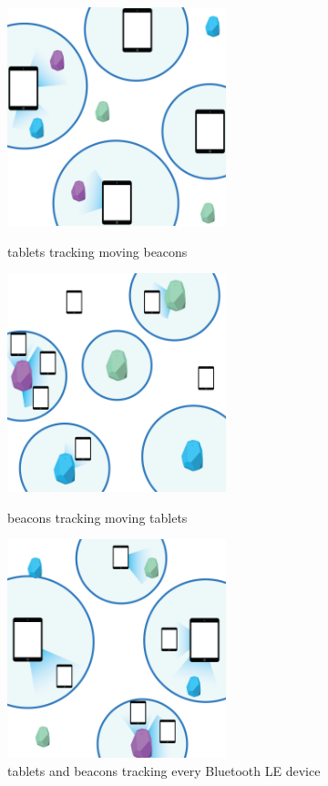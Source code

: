 \begin{figure}
\centering
\includegraphics[width=2.5in]{images/room-places-use-case-1.png}
\caption{tablets tracking moving beacons}
\label{fig:use_case_1}
\includegraphics[width=2.5in]{images/room-places-use-case-2.png}
\caption{beacons tracking moving tablets}
\label{fig:use_case_2}
\includegraphics[width=2.5in]{images/room-places-use-case-3.png}
\caption{tablets and beacons tracking every Bluetooth LE device}
\label{fig:use_case_3}
\end{figure}

